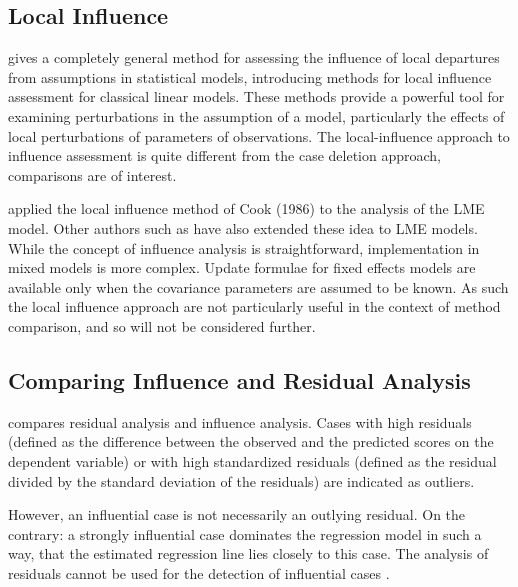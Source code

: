 \documentclass[12pt, a4paper]{report}
\theoremstyle{plain}
\theoremstyle{definition}
\theoremstyle{remark}
\begin{document}
	
\subsection{Local Influence}
\citet{cook86} gives a completely general method for assessing the influence of local departures from assumptions in statistical models, introducing methods for local influence assessment for classical linear models. These methods provide a powerful tool for examining perturbations in the assumption of a model, particularly the effects of local perturbations of parameters of observations. The local-influence approach to influence assessment is quite different from the case deletion approach, comparisons are of interest.

\citet{Beckman} applied the local influence method of Cook (1986) to the analysis of the LME model.  Other authors such as \citet{lesaffre1998local} have also extended these idea to LME models. 
While the concept of influence analysis is straightforward, implementation in mixed models is more complex. Update formulae for fixed effects models are available only when the covariance parameters are assumed to be known. As such the local influence approach are not particularly useful in the context of method comparison, and so will not be considered further.


	\subsection{Comparing Influence and Residual Analysis}
	
	\citet{influenceLME4} compares residual analysis and influence analysis. Cases with high residuals (defined as the difference between the observed and the predicted scores on the dependent
	variable) or with high standardized residuals (defined as the residual divided by the standard deviation
	of the residuals) are indicated as outliers.
	
	However, an influential case is not necessarily an outlying residual. On the contrary: a strongly influential case dominates
	the regression model in such a way, that the estimated regression line lies closely to this case. The analysis of residuals cannot be used for the detection of influential cases \citep{crawley2012r}.
	
\end{document}
